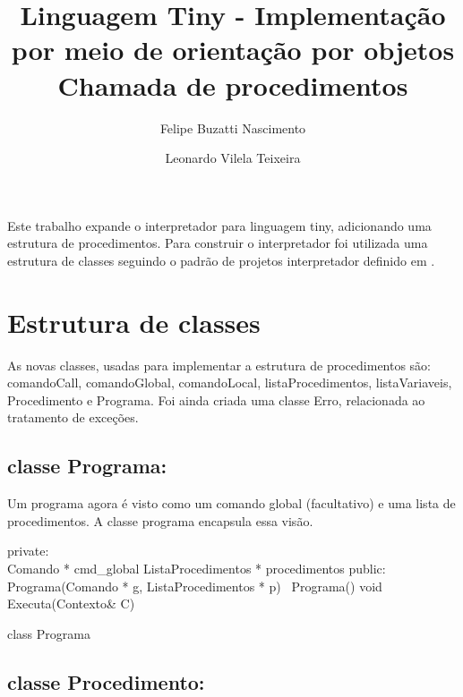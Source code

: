 \documentclass[12pt]{article}
\title{Linguagem Tiny - Implementação por meio de orientação por objetos \\ Chamada de procedimentos}
\author{Felipe Buzatti Nascimento \and Leonardo Vilela Teixeira}
\begin{document}
 

\maketitle

\begin{resumo} 
Este trabalho expande o interpretador para linguagem tiny, adicionando uma estrutura de procedimentos. Para construir o interpretador foi utilizada uma estrutura de classes seguindo o padrão de projetos interpretador definido em \cite{GoF}.
\end{resumo}


\section{Estrutura de classes}

As novas classes, usadas para implementar a estrutura de procedimentos são: comandoCall, comandoGlobal, comandoLocal, listaProcedimentos, listaVariaveis, Procedimento e Programa.
Foi ainda criada uma classe Erro, relacionada ao tratamento de exceções.

\subsection{classe Programa:} 

Um programa agora é visto como um comando global (facultativo) e uma lista de procedimentos. A classe programa encapsula essa visão.
\begin{algorithm}[h!]
\begin{footnotesize}

	private:\\
		Comando * cmd\_global\;
		ListaProcedimentos * procedimentos\;
	public: \\
		Programa(Comando * g, ListaProcedimentos * p)\;
		~Programa()\;
		void Executa(Contexto\& C)\;

\caption{class Programa}%
\end{footnotesize}
\end{algorithm}

\subsection{classe Procedimento:} 
\end{document}
